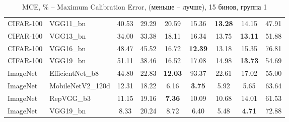 \begin{table}[h!]
{\begin{tabular}{llccccccc}
CIFAR-100 &          VGG11\_bn &         40.53 &        29.29 &                  20.59 &                  15.36 & \textbf{13.28} &                  14.15 &       47.91 \\
CIFAR-100 &          VGG13\_bn &         34.00 &        33.38 &                  18.11 &                  16.34 &                  13.75 & \textbf{13.11} &       51.88 \\
CIFAR-100 &          VGG16\_bn &         48.47 &        45.52 &                  16.72 & \textbf{12.39} &                  13.18 &                  15.35 &       76.81 \\
CIFAR-100 &          VGG19\_bn &         51.11 &        38.46 &                  16.52 &                  17.08 &                  14.98 & \textbf{13.73} &       54.69 \\
 ImageNet &   EfficientNet\_b8 &         44.80 &        22.83 & \textbf{12.03} &                  93.37 &                  22.61 &                  17.02 &       55.00 \\
 ImageNet &  MobileNetV2\_120d &         12.31 &        18.22 &                   6.16 &  \textbf{3.75} &                   5.92 &                   5.65 &       63.64 \\
 ImageNet &         RepVGG\_b3 &         11.15 &        19.16 &  \textbf{7.36} &                  10.09 &                  10.68 &                  14.01 &       61.53 \\
 ImageNet &          VGG19\_bn &          8.33 &        20.24 &                   8.72 &                   6.40 &                   5.48 &  \textbf{4.71} &       72.88 \\
\bottomrule
\end{tabular}%
}
\caption{MCE, \% -- Maximum Calibration Error, (меньше -- лучше), 15 бинов, группа 1}
\label{tab:metrics:MCE_1}
\end{table}
